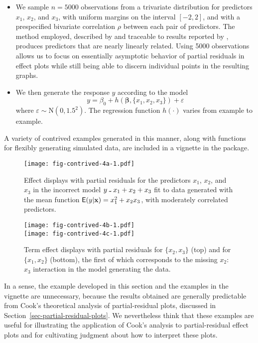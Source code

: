\documentclass[article]{jss}
\newcommand{\x}{\mathbf{x}}
\newcommand{\tild}{\symbol{126}}
\newcommand{\Rtilde}{\,\raisebox{-.5ex}{\code{\tild{}}}\,}
\newcommand{\captilde}{\mbox{\protect\Rtilde}} %
\newcommand{\bbeta}{\boldsymbol{\beta}}
\newcommand{\inter}[2]{\mbox{$#1$:$#2$}}
\newcommand{\N}{\mathrm{N}}
\newcommand{\R}{\proglang{R}}
\begin{document}
\begin{itemize}

\item We sample $n = 5000$ observations from a trivariate distribution for predictors $x_1$, $x_2$, and $x_3$, with uniform margins on the interval $[-2, 2]$, and with a prespecified bivariate correlation $\rho$ between each pair of predictors. The method employed, described by \citet{Schumann15} and traceable to results reported by \citet{Pearson07}, produces predictors that are nearly linearly related. Using 5000 observations allows us to focus on essentially asymptotic behavior of partial residuals in effect plots while still being able to discern individual points in the resulting graphs.

\item We then generate the response $y$ according to the model
\begin{equation}
y = \beta_0 + h\left(\bbeta, \{x_1, x_2, x_3\}\right) + \varepsilon
\end{equation}
where $\varepsilon \sim \N(0, 1.5^2)$. The regression function $h(\cdot)$ varies from example to example.

\end{itemize}
%
A variety of contrived examples generated in this manner, along with \R{} functions for flexibly generating simulated data, are included in a vignette in the  package.


\begin{figure}[t!]
  \centering
    \texttt{[image: fig-contrived-4a-1.pdf]}
  \caption{Effect displays with partial residuals for the predictors $x_1$, $x_2$, and $x_3$ in the incorrect model $y \captilde x_1 + x_2 + x_3$ fit to data generated with the mean function $\E(y|\x) = x_1^2 + x_2x_3$, with moderately correlated predictors.}\label{fig-contrived-4a}
\end{figure}
\begin{figure}[t!]
  \centering
    \texttt{[image: fig-contrived-4b-1.pdf]} \\
    \texttt{[image: fig-contrived-4c-1.pdf]}
  \caption{Term effect displays with partial residuals for $\{x_2, x_3 \}$ (top) and for $\{x_1, x_2 \}$ (bottom), the first of which corresponds to the missing \inter{x_2}{x_3} interaction in the model generating the data.}\label{fig-contrived-4b}
\end{figure}


In a sense, the example developed in this section and the examples in
the vignette are unnecessary, because the results obtained are
generally predictable from Cook's theoretical analysis of
partial-residual plots, discussed in
Section~\ref{sec-partial-residual-plots}. We nevertheless think that
these examples are useful for illustrating the application of Cook's
analysis to partial-residual effect plots and for cultivating judgment
about how to interpret these plots.
\end{document}

